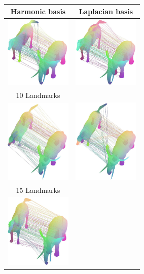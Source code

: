 \documentclass[acmtog,authorversion]{acmart}
\begin{document}
\begin{figure}[t]
\begin{tabular}{cc}
Harmonic basis &Laplacian basis\\
\hline
\includegraphics[width=90pt]{FMAP-images/TOSCA-10LANDMARKS-10LAPLACIAN-HARMONIC-BASIS-A.jpg}
&\includegraphics[width=90pt]{FMAP-images/TOSCA-10LANDMARKS-10LAPLACIAN-HARMONIC-BASIS-B.jpg}\\
10 Landmarks &\\
\hline
\includegraphics[width=90pt]{FMAP-images/TOSCA-10LANDMARKS-10LAPLACIAN-HARMONIC-BASIS-C.jpg}
&\includegraphics[width=90pt]{FMAP-images/TOSCA-10LANDMARKS-10LAPLACIAN-HARMONIC-BASIS-D.jpg}\\
15 Landmarks &\\
\hline
\includegraphics[width=90pt]{FMAP-images/TOSCA-10LANDMARKS-10LAPLACIAN-HARMONIC-BASIS-E.jpg}

\end{tabular}
\end{figure}
\end{document}
